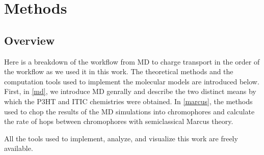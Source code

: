 \chapter{Methods}
\label{chap:methods}
\section{Overview}

Here is a breakdown of the workflow from MD to charge transport in the order of the workflow as we used it in
this work. 
The theoretical methods and the computation tools used to implement the molecular models are introduced
below. First, in \autoref{md}, we introduce MD genrally and describe the two distinct means by 
which the P3HT and ITIC chemistries were obtained. In \autoref{marcus}, the methods used to chop the
results of the MD simulations into chromophores and calculate the rate of hops between chromophores with 
semiclassical Marcus theory. 
 
All the tools used to implement, analyze, and
visualize this work are freely available. 

